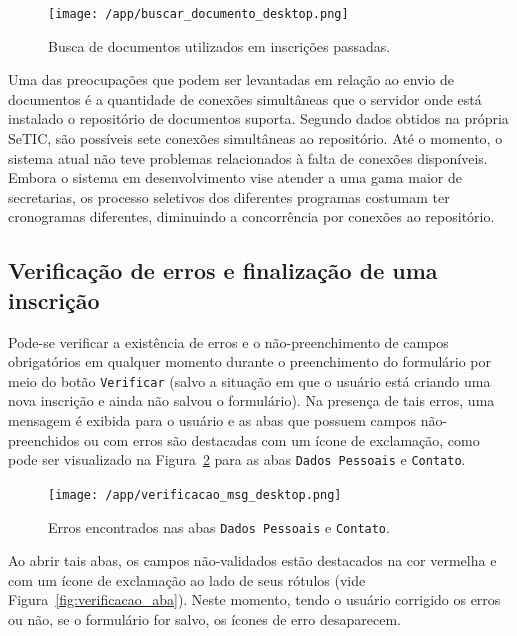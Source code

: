 \documentclass[
  10.5pt,				  %
	openright,			%
	twoside,			  %
  a5paper,
  chapter=TITLE,	%
	section=TITLE,	%
  hyphens,        %
	english,        %
	brazil          %
]{abntex2}
\begin{document}
\begin{figure}[!ht]
  \caption{\label{fig:buscar_documento_desktop} Busca de documentos utilizados em inscrições passadas.}
  \begin{center}
    \texttt{[image: /app/buscar\_documento\_desktop.png]}
  \end{center}
\end{figure}


Uma das preocupações que podem ser levantadas em relação ao envio de documentos é a quantidade de conexões simultâneas que o servidor onde está instalado o repositório de documentos suporta. Segundo dados obtidos na própria SeTIC, são possíveis sete conexões simultâneas ao repositório. Até o momento, o sistema atual não teve problemas relacionados à falta de conexões disponíveis. Embora o sistema em desenvolvimento vise atender a uma gama maior de secretarias, os processo seletivos dos diferentes programas costumam ter cronogramas diferentes, diminuindo a concorrência por conexões ao repositório.


\subsection{Verificação de erros e finalização de uma inscrição}\label{sec:validacao}

Pode-se verificar a existência de erros e o não-preenchimento de campos obrigatórios em qualquer momento durante o preenchimento do formulário por meio do botão \texttt{Verificar} (salvo a situação em que o usuário está criando uma nova inscrição e ainda não salvou o formulário).
%
Na presença de tais erros, uma mensagem é exibida para o usuário e as abas que possuem campos não-preenchidos ou com erros são destacadas com um ícone de exclamação, como pode ser visualizado na Figura~\ref{fig:verificacao_msg} para as abas \texttt{Dados Pessoais} e \texttt{Contato}.
%
\begin{figure}[!ht]
  \caption{\label{fig:verificacao_msg} Erros encontrados nas abas \texttt{Dados Pessoais} e \texttt{Contato}.}
  \begin{center}
    \texttt{[image: /app/verificacao\_msg\_desktop.png]}
  \end{center}
\end{figure}

Ao abrir tais abas, os campos não-validados estão destacados na cor vermelha e com um ícone de exclamação ao lado de seus rótulos (vide Figura~\ref{fig:verificacao_aba}). Neste momento, tendo o usuário corrigido os erros ou não, se o formulário for salvo, os ícones de erro desaparecem.
\end{document}
